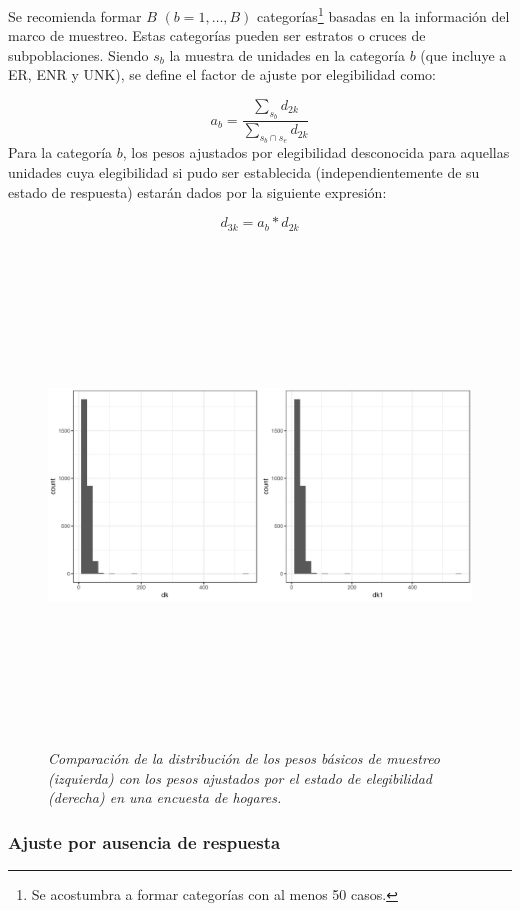 \documentclass[
  12pt,
  spanish,
]{book}
\begin{document}
Se recomienda formar \(B\) \((b = 1, \ldots, B)\) categorías\footnote{Se acostumbra a formar categorías con al menos 50 casos.} basadas en la información del marco de muestreo. Estas categorías pueden ser estratos o cruces de subpoblaciones. Siendo \(s_b\) la muestra de unidades en la categoría \(b\) (que incluye a ER, ENR y UNK), se define el factor de ajuste por elegibilidad como:

\[
a_b = \frac{\sum_{s_b}d_{2k}}{\sum_{s_b \cap s_e}d_{2k}}
\]
Para la categoría \(b\), los pesos ajustados por elegibilidad desconocida para aquellas unidades cuya elegibilidad si pudo ser establecida (independientemente de su estado de respuesta) estarán dados por la siguiente expresión:

\[
d_{3k} = a_b * d_{2k}
\]

\begin{figure}
\centering
\includegraphics[width=\textwidth,height=5.20833in]{Pics/16.png}
\caption{\emph{Comparación de la distribución de los pesos básicos de muestreo (izquierda) con los pesos ajustados por el estado de elegibilidad (derecha) en una encuesta de hogares.}}
\end{figure}

\hypertarget{ajuste-por-ausencia-de-respuesta}{%
\subsubsection*{Ajuste por ausencia de respuesta}\label{ajuste-por-ausencia-de-respuesta}}
\end{document}
